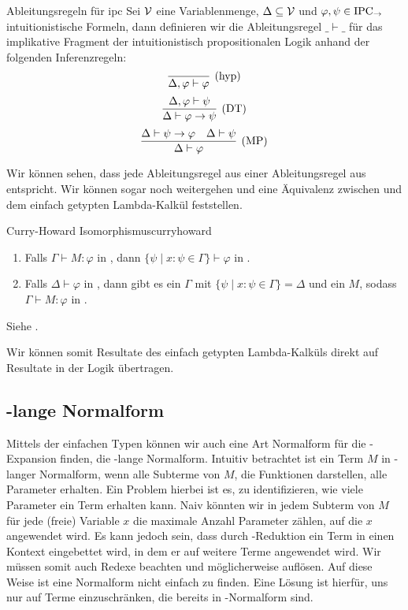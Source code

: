 \begin{definition}{Ableitungsregeln für \IPCarr}{ipc}    
    Sei $\mathcal{V}$ eine Variablenmenge, $\Delta\subseteq\mathcal{V}$ und $\varphi,\psi\in\text{IPC}_\to$ intuitionistische Formeln, dann definieren wir die Ableitungsregel $\_ \vdash \_$ für das implikative Fragment der intuitionistisch propositionalen Logik anhand der folgenden Inferenzregeln:
        \[\infer[(\text{hyp})]{\Delta,\varphi\vdash\varphi}{}\]
        \[\infer[(\text{DT})]{\Delta\vdash\varphi\to\psi}{\Delta, \varphi\vdash\psi}\]
        \[\infer[(\text{MP})]{\Delta\vdash\varphi}{\Delta\vdash\psi\to\varphi&\Delta\vdash\psi}\]
\end{definition}

Wir können sehen, dass jede Ableitungsregel aus  einer Ableitungsregel aus  entspricht. Wir können sogar noch weitergehen und eine Äquivalenz zwischen \IPCarr{} und dem einfach getypten Lambda-Kalkül feststellen.
\begin{theorem}{Curry-Howard Isomorphismus\cite{lecturesCH}}{curryhoward}
    \begin{enumerate}
       \item Falls $\Gamma\vdash M : \varphi$ in \STLC, dann $\{\psi\mid x:\psi\in\Gamma\}\vdash\varphi$ in \IPCarr.
       \item Falls $\Delta\vdash\varphi$ in \IPCarr, dann gibt es ein $\Gamma$ mit $\{\psi\mid x:\psi\in\Gamma\}=\Delta$ und ein $M$, sodass $\Gamma\vdash M :\varphi$ in \STLC.
    \end{enumerate}
\Proof
Siehe \cite{lecturesCH}.
\end{theorem}
Wir können somit Resultate des einfach getypten Lambda-Kalküls direkt auf Resultate in der Logik übertragen.

\subsection{\teta-lange Normalform}
\label{longnf}
Mittels der einfachen Typen können wir auch eine Art Normalform für die \teta-Expansion finden, die \teta-lange Normalform. Intuitiv betrachtet ist ein Term $M$ in \teta-langer Normalform, wenn alle Subterme von $M$, die Funktionen darstellen, alle Parameter erhalten. Ein Problem hierbei ist es, zu identifizieren, wie viele Parameter ein Term erhalten kann. Naiv könnten wir in jedem Subterm von $M$ für jede (freie) Variable $x$ die maximale Anzahl Parameter zählen, auf die $x$ angewendet wird. Es kann jedoch sein, dass durch \tbeta-Reduktion ein Term in einen Kontext eingebettet wird, in dem er auf weitere Terme angewendet wird. Wir müssen somit auch Redexe beachten und möglicherweise auflösen. Auf diese Weise ist eine Normalform nicht einfach zu finden. Eine Lösung ist hierfür, uns nur auf Terme einzuschränken, die bereits in \tbeta-Normalform sind. 

